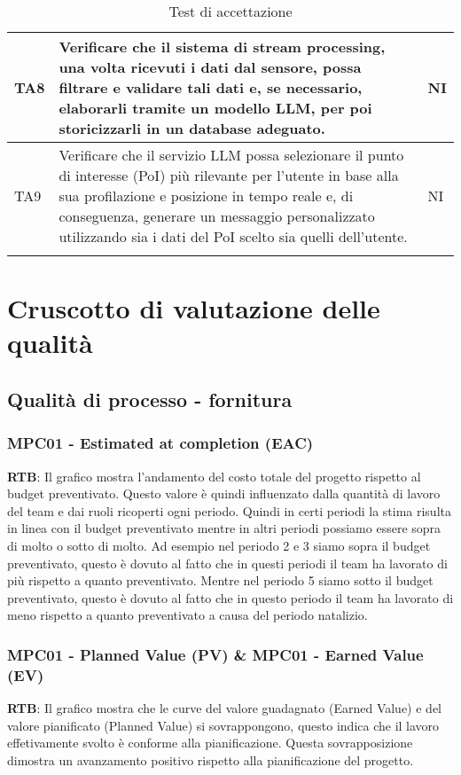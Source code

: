 \documentclass[10pt]{article}
\begin{document}
\begin{justify}
\begin{longtable}{|>{\centering\arraybackslash}m{2cm}|>{\centering\arraybackslash}m{7cm}|>{\centering\arraybackslash}m{2cm}|}
\hline
TA8 & Verificare che il sistema di stream processing, una volta ricevuti i dati dal sensore, possa filtrare e validare tali dati e, se necessario, elaborarli tramite un modello LLM, per poi storicizzarli in un database adeguato. & NI \\
\hline
TA9 & Verificare che il servizio LLM possa selezionare il punto di interesse (PoI) più rilevante per l'utente in base alla sua profilazione e posizione in tempo reale e, di conseguenza, generare un messaggio personalizzato utilizzando sia i dati del PoI scelto sia quelli dell'utente. & NI \\
\hline
\caption{Test di accettazione}\\
\end{longtable}


\section{Cruscotto di valutazione delle qualità}
\subsection{Qualità di processo - fornitura}
\subsubsection{MPC01 - Estimated at completion (EAC)}
\textbf{RTB}: Il grafico mostra l'andamento del costo totale del progetto rispetto al budget preventivato. Questo valore è quindi influenzato dalla quantità di lavoro del team e dai ruoli ricoperti ogni periodo. Quindi in certi periodi la stima risulta in linea con il budget preventivato mentre in altri periodi possiamo essere sopra di molto o sotto di molto. Ad esempio nel periodo 2 e 3 siamo sopra il budget preventivato, questo è dovuto al fatto che in questi periodi il team ha lavorato di più rispetto a quanto preventivato. Mentre nel periodo 5 siamo sotto il budget preventivato, questo è dovuto al fatto che in questo periodo il team ha lavorato di meno rispetto a quanto preventivato a causa del periodo natalizio.\\
\subsubsection{MPC01 - Planned Value (PV) \& MPC01 - Earned Value (EV)}
\textbf{RTB}: Il grafico mostra che le curve del valore guadagnato (Earned Value) e del valore pianificato (Planned Value) si sovrappongono, questo indica che il lavoro effetivamente svolto è conforme alla pianificazione. Questa sovrapposizione dimostra un avanzamento positivo rispetto alla pianificazione del progetto.

\end{justify}
\end{document}
